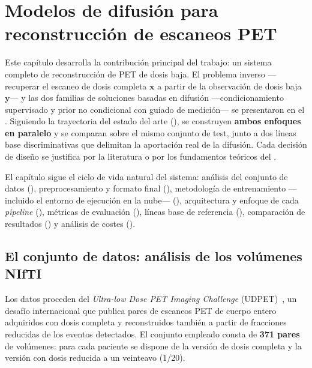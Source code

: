 \chapter{Modelos de difusión para reconstrucción de escaneos PET}
\label{cap:pet}

Este capítulo desarrolla la contribución principal del trabajo: un
sistema completo de reconstrucción de PET de dosis baja. El problema
inverso ---recuperar el escaneo de dosis completa $\mathbf{x}$ a partir
de la observación de dosis baja $\mathbf{y}$--- y las dos familias de
soluciones basadas en difusión ---condicionamiento supervisado y prior
no condicional con guiado de medición--- se presentaron en el
. Siguiendo la trayectoria del estado del arte
(), se construyen \textbf{ambos enfoques en
paralelo} y se comparan sobre el mismo conjunto de test, junto a dos
líneas base discriminativas que delimitan la aportación real de la
difusión. Cada decisión de diseño se justifica por la literatura o por
los fundamentos teóricos del .

El capítulo sigue el ciclo de vida natural del sistema: análisis del
conjunto de datos (), preprocesamiento y formato
final (), metodología de entrenamiento
—incluido el entorno de ejecución en la nube—
(), arquitectura y enfoque de cada
\textit{pipeline} (), métricas de
evaluación (), líneas base de referencia
(), comparación de resultados
() y análisis de costes
().

\section{El conjunto de datos: análisis de los volúmenes NIfTI}
\label{sec:pet-datos}

Los datos proceden del \textit{Ultra-low Dose PET Imaging
Challenge} (UDPET)~\cite{udpet2025}, un desafío internacional que
publica pares de escaneos PET de cuerpo entero adquiridos con dosis
completa y reconstruidos también a partir de fracciones reducidas de
los eventos detectados. El conjunto empleado consta de \textbf{371
pares} de volúmenes: para cada paciente se dispone de la versión de
dosis completa y la versión con dosis reducida a un veinteavo (1/20).

